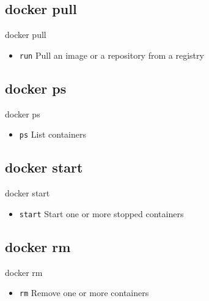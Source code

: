 \subsection{docker pull}\label{subsec:docker-pull}
\begin{frame}{docker pull}
    \begin{itemize}
        \item \texttt{run} Pull an image or a repository from a registry
        \pause
        
    \end{itemize}
\end{frame}

\subsection{docker ps}\label{subsec:docker-ps}
\begin{frame}{docker ps}
    \begin{itemize}
        \item \texttt{ps} List containers
        \pause
        
    \end{itemize}
\end{frame}

\subsection{docker start}\label{subsec:docker-start}
\begin{frame}{docker start}
    \begin{itemize}
        \item \texttt{start} Start one or more stopped containers
        \pause
        
    \end{itemize}
\end{frame}

\subsection{docker rm}\label{subsec:docker-rm}
\begin{frame}{docker rm}
    \begin{itemize}
        \item \texttt{rm} Remove one or more containers
        \pause
        
    \end{itemize}
\end{frame}

